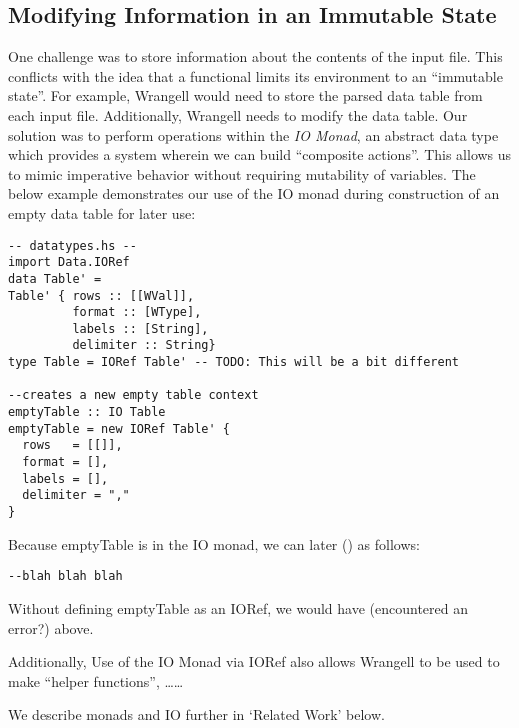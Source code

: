 \documentclass[preprint,nocopyrightspace]{sig-alternate}
\begin{document}
\subsection{Modifying Information in an Immutable State}
One challenge was to store information about the contents of the input file. This conflicts with the idea that a functional limits its environment to an ``immutable state''. For example, Wrangell would need to store the parsed data table from each input file. Additionally, Wrangell needs to modify the data table. Our solution was to perform operations within the \emph{IO Monad}, an abstract data type which provides a system wherein we can build ``composite actions''. This allows us to mimic imperative behavior without requiring mutability of variables.  
The below example demonstrates our use of the IO monad during construction of an empty data table for later use: 
\begin{lstlisting}
-- datatypes.hs --
import Data.IORef
data Table' = 
Table' { rows :: [[WVal]], 
         format :: [WType], 
         labels :: [String], 
         delimiter :: String}
type Table = IORef Table' -- TODO: This will be a bit different

--creates a new empty table context
emptyTable :: IO Table
emptyTable = new IORef Table' {    
  rows   = [[]],
  format = [],
  labels = [],
  delimiter = ","
}
\end{lstlisting}

Because emptyTable is in the IO monad, we can later () as follows:
\begin{lstlisting}
--blah blah blah
\end{lstlisting}

Without defining emptyTable as an IORef, we would have (encountered an error?) above. 

Additionally, Use of the IO Monad via IORef also allows Wrangell to be used to make “helper functions”, ……

We describe monads and IO further in ‘Related Work’ below. 
\end{document}

